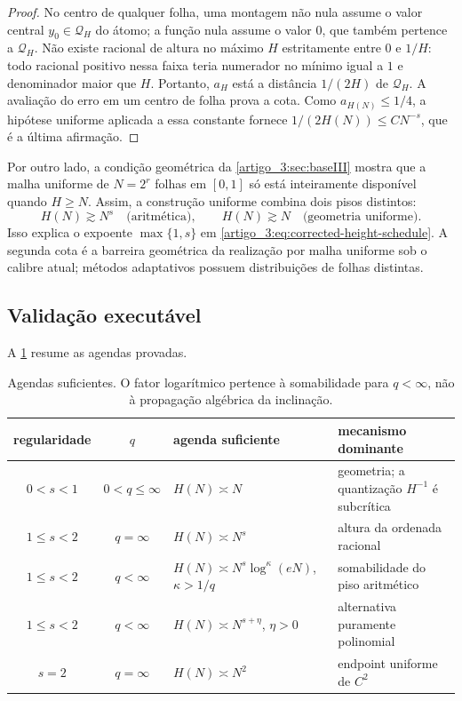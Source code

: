 \begin{proof}
No centro de qualquer folha, uma montagem não nula assume o valor central
$y_0\in\mathcal Q_H$ do átomo; a função nula assume o valor $0$, que também
pertence a $\mathcal Q_H$. Não existe racional de altura no máximo $H$
estritamente entre $0$ e $1/H$: todo racional positivo nessa faixa teria
numerador no mínimo igual a $1$ e denominador maior que $H$. Portanto,
$a_H$ está a distância $1/(2H)$ de $\mathcal Q_H$. A avaliação do erro em um
centro de folha prova a cota. Como $a_{H(N)}\le1/4$, a hipótese uniforme
aplicada a essa constante fornece
$1/(2H(N))\le CN^{-s}$, que é a última afirmação.
\end{proof}

Por outro lado, a condição geométrica da \cref{artigo_3:sec:baseIII} mostra que a malha
uniforme de $N=2^r$ folhas em $[0,1]$ só está inteiramente disponível quando
$H\ge N$. Assim, a construção uniforme combina dois pisos distintos:
\begin{equation}
 H(N)\gtrsim N^s\quad\text{(aritmética)},
 \qquad
 H(N)\gtrsim N\quad\text{(geometria uniforme)}.
 \label{artigo_3:eq:two-height-floors}
\end{equation}
Isso explica o expoente $\max\{1,s\}$ em
\eqref{artigo_3:eq:corrected-height-schedule}. A segunda cota é a barreira geométrica
da realização por malha uniforme sob o calibre atual; métodos adaptativos
possuem distribuições de folhas distintas.

\subsection{Validação executável}

A \cref{artigo_3:tab:height-schedules} resume as agendas provadas.
\begin{table}[t]
 \centering
\caption{Agendas suficientes. O fator logarítmico pertence à
 somabilidade para $q<\infty$, não à propagação algébrica da inclinação.}\label{artigo_3:tab:height-schedules}
\small
 \begin{tabularx}{\linewidth}{@{}cclX@{}}
\toprule
regularidade & $q$ & agenda suficiente & mecanismo dominante\\
\midrule
$0<s<1$ & $0<q\le\infty$ & $H(N)\asymp N$ & geometria; a quantização $H^{-1}$ é subcrítica\\
$1\le s<2$ & $q=\infty$ & $H(N)\asymp N^s$ & altura da ordenada racional\\
$1\le s<2$ & $q<\infty$ & $H(N)\asymp N^s\log^\kappa(eN)$, $\kappa>1/q$ & somabilidade do piso aritmético\\
$1\le s<2$ & $q<\infty$ & $H(N)\asymp N^{s+\eta}$, $\eta>0$ & alternativa puramente polinomial\\
$s=2$ & $q=\infty$ & $H(N)\asymp N^2$ & endpoint uniforme de $C^2$\\
\bottomrule
\end{tabularx}
\end{table}

